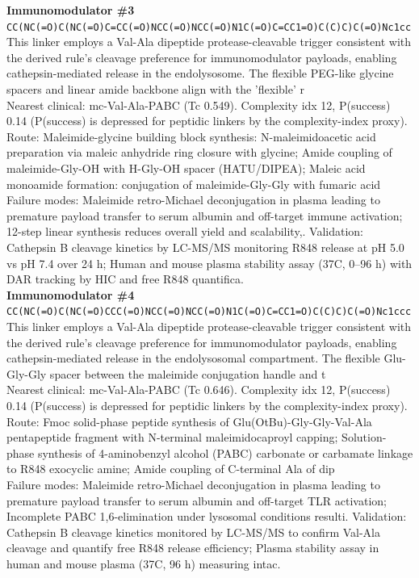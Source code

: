 \documentclass[10pt]{article}
\begin{document}
\noindent\textbf{Immunomodulator \#3} \\ \texttt{CC(NC(=O)C(NC(=O)C=CC(=O)NCC(=O)NCC(=O)N1C(=O)C=CC1=O)C(C)C)C(=O)Nc1cc} \\ This linker employs a Val-Ala dipeptide protease-cleavable trigger consistent with the derived rule's cleavage preference for immunomodulator payloads, enabling cathepsin-mediated release in the endolysosome. The flexible PEG-like glycine spacers and linear amide backbone align with the 'flexible' r \\ Nearest clinical: mc-Val-Ala-PABC (Tc 0.549). Complexity idx 12, P(success) 0.14 (P(success) is depressed for peptidic linkers by the complexity-index proxy). \\ Route: Maleimide-glycine building block synthesis: N-maleimidoacetic acid preparation via maleic anhydride ring closure with glycine; Amide coupling of maleimide-Gly-OH with H-Gly-OH spacer (HATU/DIPEA); Maleic acid monoamide formation: conjugation of maleimide-Gly-Gly with fumaric acid \\ Failure modes: Maleimide retro-Michael deconjugation in plasma leading to premature payload transfer to serum albumin and off-target immune activation; 12-step linear synthesis reduces overall yield and scalability,. Validation: Cathepsin B cleavage kinetics by LC-MS/MS monitoring R848 release at pH 5.0 vs pH 7.4 over 24 h; Human and mouse plasma stability assay (37\textdegree{}C, 0--96 h) with DAR tracking by HIC and free R848 quantifica. \\[0.4em]
\noindent\textbf{Immunomodulator \#4} \\ \texttt{CC(NC(=O)C(NC(=O)CCC(=O)NCC(=O)NCC(=O)N1C(=O)C=CC1=O)C(C)C)C(=O)Nc1ccc} \\ This linker employs a Val-Ala dipeptide protease-cleavable trigger consistent with the derived rule's cleavage preference for immunomodulator payloads, enabling cathepsin-mediated release in the endolysosomal compartment. The flexible Glu-Gly-Gly spacer between the maleimide conjugation handle and t \\ Nearest clinical: mc-Val-Ala-PABC (Tc 0.646). Complexity idx 12, P(success) 0.14 (P(success) is depressed for peptidic linkers by the complexity-index proxy). \\ Route: Fmoc solid-phase peptide synthesis of Glu(OtBu)-Gly-Gly-Val-Ala pentapeptide fragment with N-terminal maleimidocaproyl capping; Solution-phase synthesis of 4-aminobenzyl alcohol (PABC) carbonate or carbamate linkage to R848 exocyclic amine; Amide coupling of C-terminal Ala of dip \\ Failure modes: Maleimide retro-Michael deconjugation in plasma leading to premature payload transfer to serum albumin and off-target TLR activation; Incomplete PABC 1,6-elimination under lysosomal conditions resulti. Validation: Cathepsin B cleavage kinetics monitored by LC-MS/MS to confirm Val-Ala cleavage and quantify free R848 release efficiency; Plasma stability assay in human and mouse plasma (37\textdegree{}C, 96 h) measuring intac. \\[0.4em]
\end{document}
